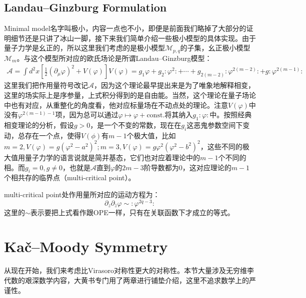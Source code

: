 \subsection{Landau–Ginzburg Formulation}
Minimal model名字叫极小，内容一点也不小，即便是前面我们略掉了大部分的证明细节还是只讲了冰山一脚，接下来我们简单介绍一些极小模型的具体实现。由于量子力学是幺正的，所以这里我们考虑的是极小模型$\mathcal{M}_{p,q}$的子集，幺正极小模型$\mathcal{M}_m$。与这个模型所对应的欧氏场论是所谓Landau–Ginzburg模型：
\begin{equation}
\begin{gathered}
		\mathcal{A}=\int d^2x\left[\frac12(\partial_\mu\varphi)^2+V(\varphi)\right]
	V(\varphi)=g_1\varphi+g_2:\varphi^2:+\cdots+g_{2(m-2)}:\varphi^{2(m-2)}:+g:\varphi^{2(m-1)}:
\end{gathered}
\end{equation}
这里我们把作用量符号改记$\mathcal{A}$，因为这个理论最早提出来是为了唯象地解释相变，这里的场实际上是序参量，上式积分得到的是自由能。当然，这个理论在量子场论中也有对应，从重整化的角度看，他对应标量场在不动点处的理论。注意$V(\varphi)$中没有$\varphi^{2(m-1)-1}$项，因为总可以通过$\varphi\mapsto\varphi+\mathrm{const.}$将其纳入$g_1:\varphi:$中。按照经典相变理论的分析，假设$g>0$，是一个不变的常数，现在在${g_i}$这恶鬼参数空间下变动，总存在一个点，使得$V(\phi)$有$m-1$个极大值，比如$m=2,V(\varphi)=g(\varphi^2-a^2)^2;m=3,V(\varphi)=g\varphi^2\left(\varphi^2-b^2\right)^2$，这些不同的极大值用量子力学的语言说就是简并基态，它们也对应着理论中的$m-1$个不同的相。而$g_i=0,g\neq 0$，也就是$\mathcal{A}$直到$\varphi$的$2m-3$阶导数都为0，这对应理论的$m-1$个相共存的临界点（multi-critical point）。

multi-critical point处作用量所对应的运动方程为：
\begin{equation}
	\partial_z\partial_{\bar{z}}\varphi\sim:\varphi^{2q-3}:
\end{equation}
这里的$\sim$表示要把上式看作跟OPE一样，只有在关联函数下才成立的等式。




\section{Ka\v{c}\mbox{–}Moody Symmetry}
从现在开始，我们来考虑比Virasoro对称性更大的对称性。本节大量涉及无穷维李代数的艰深数学内容，大黄书专门用了两章进行铺垫介绍，这里不追求数学上的严谨性。
